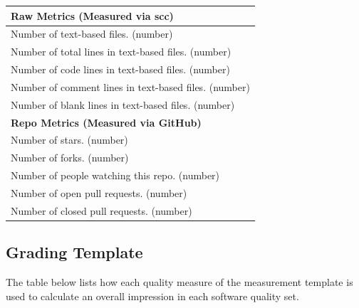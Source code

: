 \documentclass[12pt, notitlepage]{article}
\begin{document}
\begin{singlespace}
\def\arraystretch{1.4}
\begin{tabular}{p{16cm}}
	\hline		
	\textbf{Raw Metrics (Measured via scc)}\\
	\hline
	Number of text-based files. (number)\\
	Number of total lines in text-based files. (number)\\
	Number of code lines in text-based files. (number)\\
	Number of comment lines in text-based files. (number)\\
	Number of blank lines in text-based files. (number)\\
	\hline
	\textbf{Repo Metrics (Measured via GitHub)}\\
	\hline
	Number of stars. (number)\\
	Number of forks. (number)\\
	Number of people watching this repo. (number)\\
	Number of open pull requests. (number)\\
	Number of closed pull requests. (number)\\
	\hline
\end{tabular}

\newpage

\subsection{Grading Template}
The table below lists how each quality measure of the measurement template is used to calculate an overall impression in each software quality set.\newline


\end{singlespace}
\end{document}
